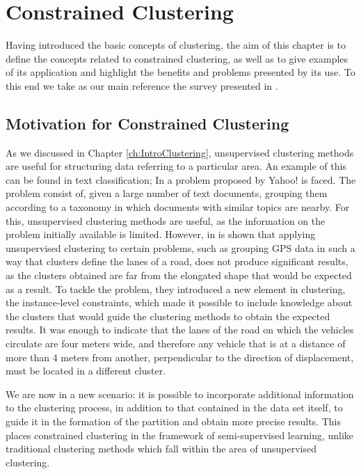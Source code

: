 \chapter{Constrained Clustering}\label{ch:ConstrainedClustering}

Having introduced the basic concepts of clustering, the aim of this chapter is to define the concepts related to constrained clustering, as well as to give examples of its application and highlight the benefits and problems presented by its use. To this end we take as our main reference the survey presented in \cite{davidson2007survey}.

\section{Motivation for Constrained Clustering}

As we discussed in Chapter \ref{ch:IntroClustering}, unsupervised clustering methods are useful for structuring data referring to a particular area. An example of this can be found in text classification; In \cite{cohn2003semi} a problem proposed by Yahoo! is faced. The problem consist of, given a large number of text documents, grouping them according to a taxonomy in which documents with similar topics are nearby. For this, unsupervised clustering methods are useful, as the information on the problem initially available is limited. However, in \cite{wagstaff2001constrained} is shown that applying unsupervised clustering to certain problems, such as grouping GPS data in such a way that clusters define the lanes of a road, does not produce significant results, as the clusters obtained are far from the elongated shape that would be expected as a result. To tackle the problem, they introduced a new element in clustering, the instance-level constraints, which made it possible to include knowledge about the clusters that would guide the clustering methods to obtain the expected results. It was enough to indicate that the lanes of the road on which the vehicles circulate are four meters wide, and therefore any vehicle that is at a distance of more than 4 meters from another, perpendicular to the direction of displacement, must be located in a different cluster.

We are now in a new scenario: it is possible to incorporate additional information to the clustering process, in addition to that contained in the data set itself, to guide it in the formation of the partition and obtain more precise results. This places constrained clustering in the framework of semi-supervised learning, unlike traditional clustering methods which fall within the area of unsupervised clustering. 

